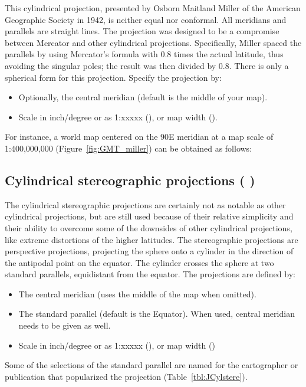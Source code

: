 This cylindrical projection, presented by Osborn Maitland Miller of the
American Geographic Society in 1942, is neither equal nor conformal.
All meridians and parallels are straight lines.  The projection was
designed to be a compromise between Mercator and other cylindrical
projections.  Specifically, Miller spaced the parallels by using
Mercator's formula with 0.8 times the actual latitude, thus avoiding
the singular poles; the result was then divided by 0.8.  There is
only a spherical form for this projection. Specify the projection by:

\begin{itemize} 
\item Optionally, the central meridian (default is the middle of your map).
\item Scale in inch/degree or as 1:xxxxx (), or map width ().
\end{itemize}

For instance, a world map centered on the 90\DS E meridian
at a map scale of 1:400,000,000 (Figure~\ref{fig:GMT_miller}) can be obtained as follows: 



\subsection{Cylindrical stereographic projections ( )}

The cylindrical stereographic projections are certainly not as notable as other cylindrical projections, but are still used because of their relative simplicity and their ability to overcome some of the downsides of other cylindrical projections, like extreme distortions of the higher latitudes. The stereographic projections are perspective projections, projecting the sphere onto a cylinder in the direction of the antipodal point on the equator. The cylinder crosses the sphere at two standard parallels, equidistant from the equator.  
The projections are defined by:
\begin{itemize} 
\item The central meridian (uses the middle of the map when omitted).
\item The standard parallel (default is the Equator). When used, central meridian needs to be given as well.
\item Scale in inch/degree or as 1:xxxxx (), or map width ()
\end{itemize}
Some of the selections of the standard parallel are named for the cartographer or publication that popularized the projection (Table~\ref{tbl:JCylstere}).

